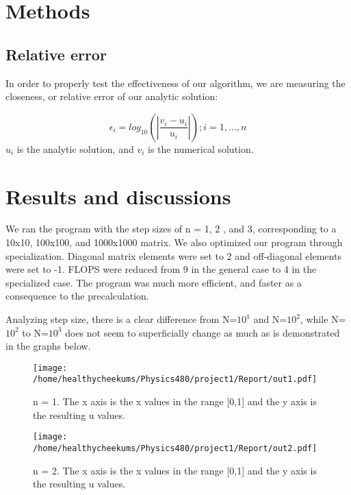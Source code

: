 \documentclass[10pt,showpacs,preprintnumbers,footinbib,amsmath,amssymb,aps,prl,twocolumn,groupedaddress,superscriptaddress,showkeys]{revtex4-1}
\begin{document}
\section{Methods}
	\subsection{Relative error}

In order to properly test the effectiveness of our algorithm, we are measuring the closeness, or relative error of our analytic solution:

	\begin{equation}
	\epsilon_{i} = log_{10}(|\frac{v_{i}-u_{i}}{u_{i}}|)  ; i = 1,...,n
	\label{error}
	\end{equation}
$u_{i}$ is the analytic solution, and $v_{i}$ is the numerical solution.

\section{Results and discussions}

 We ran the program with the step sizes of n = 1, 2 , and 3, corresponding to a 10x10, 100x100, and 1000x1000 matrix. We also optimized our program through specialization. Diagonal matrix elements were set to 2 and off-diagonal elements were set to -1. FLOPS were reduced from 9 in the general case to 4 in the specialized case. The program was much more efficient, and faster as a consequence to the precalculation. 

 Analyzing step size, there is a clear difference from N=$10^{1}$ and N=$10^{2}$, while N=$10^{2}$ to N=$10^{3}$ does not seem to superficially change as much as is demonstrated in the graphs below.
 
\begin{figure}[!ht]
	\centering
	\texttt{[image: /home/healthycheekums/Physics480/project1/Report/out1.pdf]}
	\label{uvx}
	\caption{ n = 1. The x axis is the x values in the range [0,1] and the y axis is the resulting u values.}
\end{figure}

\begin{figure}[!ht]
	\centering
	\texttt{[image: /home/healthycheekums/Physics480/project1/Report/out2.pdf]}

	\label{uvx}
	\caption{n = 2. The x axis is the x values in the range [0,1] and the y axis is the resulting u values.}
\end{figure}
\end{document}
